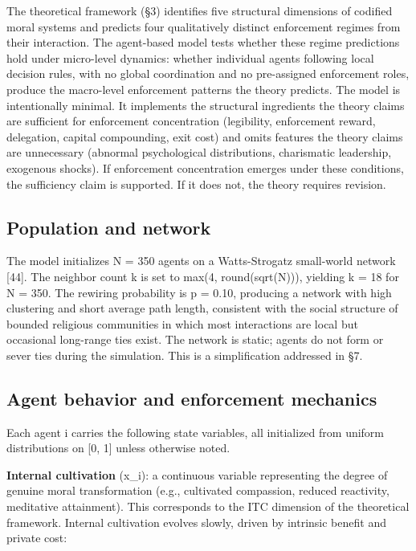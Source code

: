 \documentclass[12pt]{article}
\begin{document}
The theoretical framework (§3) identifies five structural dimensions of codified moral systems and predicts four qualitatively distinct enforcement regimes from their interaction. The agent-based model tests whether these regime predictions hold under micro-level dynamics: whether individual agents following local decision rules, with no global coordination and no pre-assigned enforcement roles, produce the macro-level enforcement patterns the theory predicts. The model is intentionally minimal. It implements the structural ingredients the theory claims are sufficient for enforcement concentration (legibility, enforcement reward, delegation, capital compounding, exit cost) and omits features the theory claims are unnecessary (abnormal psychological distributions, charismatic leadership, exogenous shocks). If enforcement concentration emerges under these conditions, the sufficiency claim is supported. If it does not, the theory requires revision.

%
\subsection{Population and network}

The model initializes N = 350 agents on a Watts-Strogatz small-world network [44]. The neighbor count k is set to max(4, round(sqrt(N))), yielding k = 18 for N = 350. The rewiring probability is p = 0.10, producing a network with high clustering and short average path length, consistent with the social structure of bounded religious communities in which most interactions are local but occasional long-range ties exist. The network is static; agents do not form or sever ties during the simulation. This is a simplification addressed in §7.

%
\subsection{Agent behavior and enforcement mechanics}

Each agent i carries the following state variables, all initialized from uniform distributions on [0, 1] unless otherwise noted.

\textbf{Internal cultivation} (x\_i): a continuous variable representing the degree of genuine moral transformation (e.g., cultivated compassion, reduced reactivity, meditative attainment). This corresponds to the ITC dimension of the theoretical framework. Internal cultivation evolves slowly, driven by intrinsic benefit and private cost:
\end{document}
